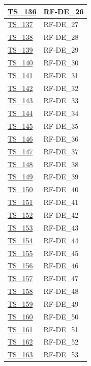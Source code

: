 \begin{longtable}{|
    >{\raggedright\arraybackslash}p{} |
    >{\centering\arraybackslash}p{} |
    }
    \hyperlink{ts-136}{TS\_136} & RF-DE\_26 \\ \hline
    \hyperlink{ts-137}{TS\_137} & RF-DE\_27 \\ \hline
    \hyperlink{ts-138}{TS\_138} & RF-DE\_28 \\ \hline
    \hyperlink{ts-139}{TS\_139} & RF-DE\_29 \\ \hline
    \hyperlink{ts-140}{TS\_140} & RF-DE\_30 \\ \hline
    \hyperlink{ts-141}{TS\_141} & RF-DE\_31 \\ \hline
    \hyperlink{ts-142}{TS\_142} & RF-DE\_32 \\ \hline
    \hyperlink{ts-143}{TS\_143} & RF-DE\_33 \\ \hline
    \hyperlink{ts-144}{TS\_144} & RF-DE\_34 \\ \hline
    \hyperlink{ts-145}{TS\_145} & RF-DE\_35 \\ \hline
    \hyperlink{ts-146}{TS\_146} & RF-DE\_36 \\ \hline
    \hyperlink{ts-147}{TS\_147} & RF-DE\_37 \\ \hline
    \hyperlink{ts-148}{TS\_148} & RF-DE\_38 \\ \hline
    \hyperlink{ts-149}{TS\_149} & RF-DE\_39 \\ \hline
    \hyperlink{ts-150}{TS\_150} & RF-DE\_40 \\ \hline
    \hyperlink{ts-151}{TS\_151} & RF-DE\_41 \\ \hline
    \hyperlink{ts-152}{TS\_152} & RF-DE\_42 \\ \hline
    \hyperlink{ts-153}{TS\_153} & RF-DE\_43 \\ \hline
    \hyperlink{ts-154}{TS\_154} & RF-DE\_44 \\ \hline
    \hyperlink{ts-155}{TS\_155} & RF-DE\_45 \\ \hline
    \hyperlink{ts-156}{TS\_156} & RF-DE\_46 \\ \hline
    \hyperlink{ts-157}{TS\_157} & RF-DE\_47 \\ \hline
    \hyperlink{ts-158}{TS\_158} & RF-DE\_48 \\ \hline
    \hyperlink{ts-159}{TS\_159} & RF-DE\_49 \\ \hline
    \hyperlink{ts-160}{TS\_160} & RF-DE\_50 \\ \hline
    \hyperlink{ts-161}{TS\_161} & RF-DE\_51 \\ \hline
    \hyperlink{ts-162}{TS\_162} & RF-DE\_52 \\ \hline
    \hyperlink{ts-163}{TS\_163} & RF-DE\_53 \\ \hline

\end{longtable}
